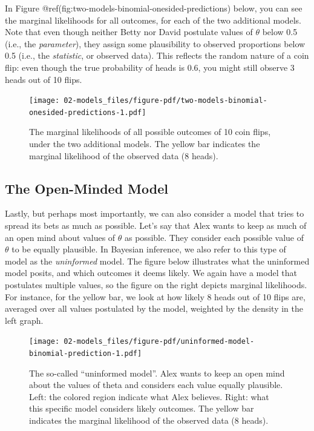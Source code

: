 \documentclass[
  letterpaper,
  DIV=11,
  numbers=noendperiod]{scrreprt}
\begin{document}
In Figure @ref(fig:two-models-binomial-onesided-predictions) below, you
can see the marginal likelihoods for all outcomes, for each of the two
additional models. Note that even though neither Betty nor David
postulate values of \(\theta\) below 0.5 (i.e., the \emph{parameter}),
they assign some plausibility to observed proportions below 0.5 (i.e.,
the \emph{statistic}, or observed data). This reflects the random nature
of a coin flip: even though the true probability of heads is \(0.6\),
you might still observe 3 heads out of 10 flips.

\begin{figure}

{\centering \texttt{[image: 02-models\_files/figure-pdf/two-models-binomial-onesided-predictions-1.pdf]}

}

\caption{The marginal likelihoods of all possible outcomes of 10 coin
flips, under the two additional models. The yellow bar indicates the
marginal likelihood of the observed data (8 heads).}

\end{figure}

\hypertarget{open-minded-model-section}{%
\subsection{The Open-Minded Model}\label{open-minded-model-section}}

Lastly, but perhaps most importantly, we can also consider a model that
tries to spread its bets as much as possible. Let's say that Alex wants
to keep as much of an open mind about values of \(\theta\) as possible.
They consider each possible value of \(\theta\) to be equally plausible.
In Bayesian inference, we also refer to this type of model as the
\emph{uninformed} model. The figure below illustrates what the
uninformed model posits, and which outcomes it deems likely. We again
have a model that postulates multiple values, so the figure on the right
depicts marginal likelihoods. For instance, for the yellow bar, we look
at how likely 8 heads out of 10 flips are, averaged over all values
postulated by the model, weighted by the density in the left graph.

\begin{figure}

{\centering \texttt{[image: 02-models\_files/figure-pdf/uninformed-model-binomial-prediction-1.pdf]}

}

\caption{The so-called ``uninformed model''. Alex wants to keep an open
mind about the values of theta and considers each value equally
plausible. Left: the colored region indicate what Alex believes. Right:
what this specific model considers likely outcomes. The yellow bar
indicates the marginal likelihood of the observed data (8 heads).}

\end{figure}
\end{document}
